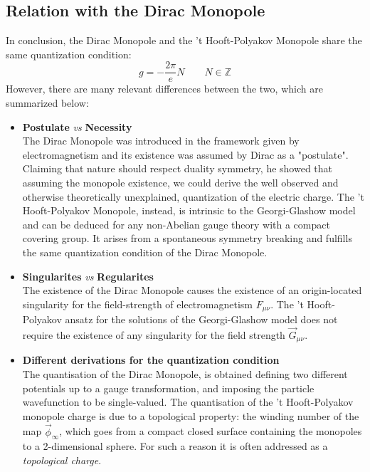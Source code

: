 \documentclass[main.tex]{subfiles}
\begin{document}
\subsection{Relation with the Dirac Monopole}
In conclusion, the Dirac Monopole and the 't Hooft-Polyakov Monopole share the same quantization condition: 
\begin{equation}
g = - \frac{2\pi}{e} N \qquad N \in  \mathbb{Z}
\end{equation}
However, there are many relevant differences between the two, which are summarized below:
\begin{itemize}
     \item \textbf{Postulate} \textit{vs} \textbf{Necessity}\medskip \\
    The Dirac Monopole was introduced in the framework given by electromagnetism and its existence was assumed by Dirac as a "postulate". Claiming that nature should respect duality symmetry, he showed that assuming the monopole existence, we could derive the well observed and otherwise theoretically unexplained, quantization of the electric charge. 
    The 't Hooft-Polyakov Monopole, instead, is intrinsic to the Georgi-Glashow model and can be deduced for any non-Abelian gauge theory with a compact covering group. It arises from a spontaneous symmetry breaking and fulfills the same quantization condition of the Dirac Monopole.
    
    \item \textbf{Singularites} \textit{vs} \textbf{Regularites}\medskip \\
    The existence of the Dirac Monopole causes the existence of an origin-located singularity for the field-strength of electromagnetism $F_{\mu \nu}$.
    The 't Hooft-Polyakov ansatz for the solutions of the Georgi-Glashow model does not require the existence of any singularity for the field strength $\vec{G}_{\mu \nu }$.
    
    \item \textbf{Different derivations for the quantization condition} \medskip \\
    The quantisation of the Dirac Monopole, is obtained defining two different potentials up to a gauge transformation, and imposing the particle wavefunction to be single-valued. 
    The quantisation of the 't Hooft-Polyakov monopole charge is due to a topological property: the winding number of the map $\vec{\phi}_\infty $, which goes from a compact closed surface containing the monopoles to a 2-dimensional sphere. For such a reason it is often addressed as a \textit{topological charge}.
\end{itemize} 
\end{document}
